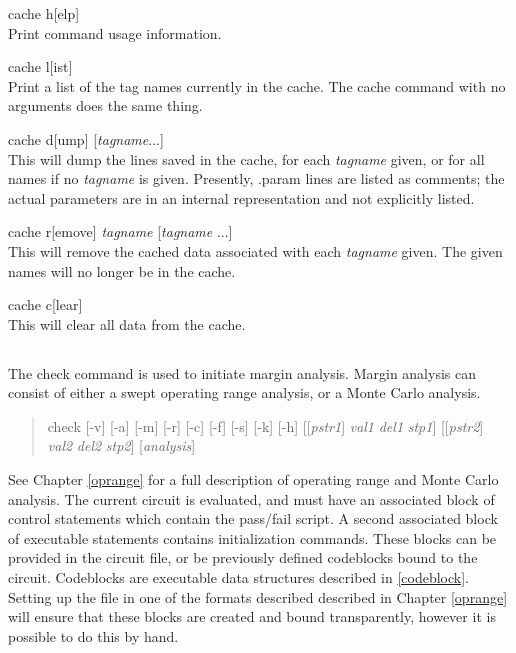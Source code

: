 \begin{description}
\item{\vt cache h}[{\vt elp}]\\
Print command usage information.
\item{\vt cache l}[{\vt ist}]\\
Print a list of the tag names currently in the cache.  The
{\cb cache} command with no arguments does the same thing.
\item{\vt cache d}[{\vt ump}] [{\it tagname}...]\\
This will dump the lines saved in the cache, for each
{\it tagname} given, or for all names if no {\it tagname} is
given.  Presently, {\vt .param} lines are listed as comments; 
the actual parameters are in an internal representation and not
explicitly listed.
\item{\vt cache r}[{\vt emove}] {\it tagname} [{\it tagname} ...]\\
This will remove the cached data associated with each
{\it tagname} given.  The given names will no longer be in the cache.
\item{\vt cache c}[{\vt lear}]\\
This will clear all data from the cache.
\end{description}

\subsection{}
\label{checkcom}


The {\cb check} command is used to initiate margin analysis.  Margin
analysis can consist of either a swept operating range analysis, or
a Monte Carlo analysis.
\begin{quote}
{\vt check} [{\vt -v}] [{\vt -a}] [{\vt -m}] [{\vt -r}] [{\vt -c}]
  [{\vt -f}] [{\vt -s}] [{\vt -k}] [{\vt -h}]
  [[{\it pstr1\/}] {\it val1} {\it del1} {\it stp1\/}]
  [[{\it pstr2\/}] {\it val2} {\it del2} {\it stp2\/}]
  [{\it analysis\/}]
\end{quote}
See Chapter \ref{oprange} for a full description of operating range
and Monte Carlo analysis.  The current circuit is evaluated, and must
have an associated block of control statements which contain the
pass/fail script.  A second associated block of executable statements
contains initialization commands.  These blocks can be provided in the
circuit file, or be previously defined codeblocks bound to the
circuit.  Codeblocks are executable data structures described in
\ref{codeblock}.  Setting up the file in one of the formats described
described in Chapter \ref{oprange} will ensure that these blocks are
created and bound transparently, however it is possible to do this by
hand.

